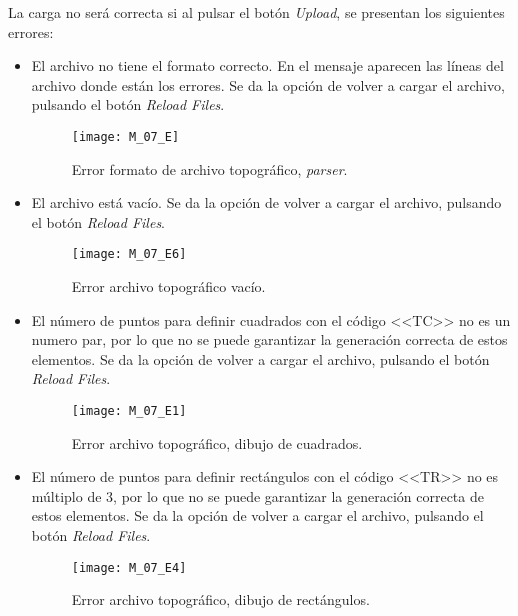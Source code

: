La carga no será correcta si al pulsar el botón \emph{Upload}, se presentan los siguientes errores:
\begin{itemize}



\item El archivo no tiene el formato correcto. En el mensaje aparecen las líneas del archivo donde están los errores. Se da la opción de volver a cargar el archivo, pulsando el botón \emph{Reload Files}.

\begin{figure}[H]
	\centering
	\texttt{[image: M\_07\_E]}
	\caption{Error formato de archivo topográfico, \emph{parser}.}
	\label{fig:M_07_E}
\end{figure}

\item El archivo está vacío. Se da la opción de volver a cargar el archivo, pulsando el botón \emph{Reload Files}.

\begin{figure}[H]
	\centering
	\texttt{[image: M\_07\_E6]}
	\caption{Error archivo topográfico vacío.}
	\label{fig:M_07_E6}
\end{figure}

\item El número de puntos para definir cuadrados con el código <<TC>> no es un numero par, por lo que no se puede garantizar la generación correcta de estos elementos. Se da la opción de volver a cargar el archivo, pulsando el botón \emph{Reload Files}.

\begin{figure}[H]
	\centering
	\texttt{[image: M\_07\_E1]}
	\caption{Error archivo topográfico, dibujo de cuadrados.}
	\label{fig:M_07_E1}
\end{figure}

\item El número de puntos para definir rectángulos con el código <<TR>> no es múltiplo de 3, por lo que no se puede garantizar la generación correcta de estos elementos. Se da la opción de volver a cargar el archivo, pulsando el botón \emph{Reload Files}.

\begin{figure}[H]
	\centering
	\texttt{[image: M\_07\_E4]}
	\caption{Error archivo topográfico, dibujo de rectángulos.}
	\label{fig:M_07_E4}
\end{figure}

\end{itemize}


